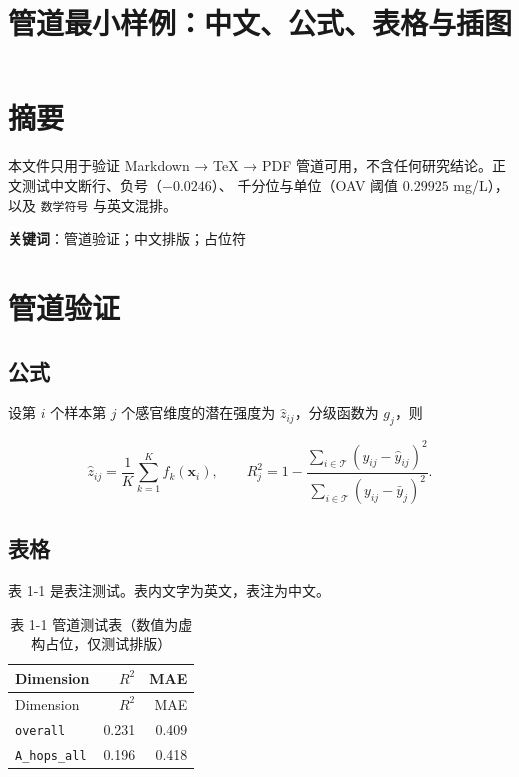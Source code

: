 \documentclass[
  a4paper,12pt]{article}
\title{管道最小样例：中文、公式、表格与插图}
\author{}
\date{}
\begin{document}
\maketitle

\renewcommand*\contentsname{目录}
{
\setcounter{tocdepth}{2}
\tableofcontents
}
\section*{摘要}\label{ux6458ux8981}

本文件只用于验证 Markdown → TeX → PDF
管道可用，不含任何研究结论。正文测试中文断行、负号（\(-0.0246\)）、
千分位与单位（OAV 阈值 \(0.29925\) mg/L），以及 \texttt{数学符号}
与英文混排。

\textbf{关键词}：管道验证；中文排版；占位符

\section{管道验证}\label{ux7ba1ux9053ux9a8cux8bc1}

\subsection{公式}\label{ux516cux5f0f}

设第 \(i\) 个样本第 \(j\) 个感官维度的潜在强度为
\(\hat z_{ij}\)，分级函数为 \(g_j\)，则

\[
\hat z_{ij}=\frac{1}{K}\sum_{k=1}^{K} f_k(\mathbf{x}_i),\qquad
R^{2}_j=1-\frac{\sum_{i\in \mathcal{T}}(y_{ij}-\hat y_{ij})^{2}}{\sum_{i\in \mathcal{T}}(y_{ij}-\bar y_{j})^{2}} .
\]

\subsection{表格}\label{ux8868ux683c}

表 1-1 是表注测试。表内文字为英文，表注为中文。

\begin{longtable}[]{@{}lrr@{}}
\caption{表 1-1 管道测试表（数值为虚构占位，仅测试排版）}\tabularnewline
\toprule\noalign{}
Dimension & \(R^{2}\) & MAE \\
\midrule\noalign{}
\endfirsthead
\toprule\noalign{}
Dimension & \(R^{2}\) & MAE \\
\midrule\noalign{}
\endhead
\bottomrule\noalign{}
\endlastfoot
\texttt{overall} & 0.231 & 0.409 \\
\texttt{A\_hops\_all} & 0.196 & 0.418 \\
\end{longtable}
\end{document}
